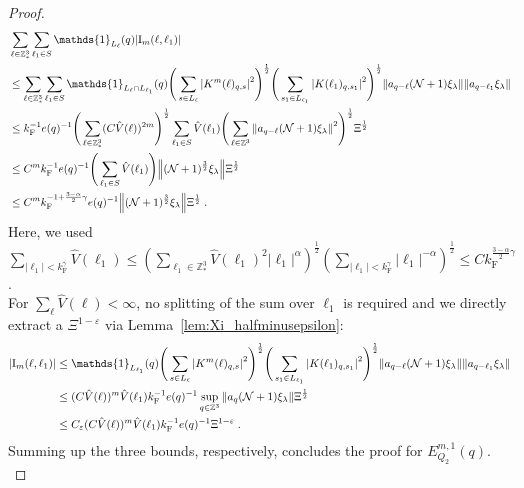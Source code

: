 \documentclass[12pt,a4paper]{article}
\numberwithin{equation}{section}
\newcommand{\1}{\mathbb{I}}
\newcommand{\F}{\mathrm{F}}
\newcommand{\I}{\mathrm{I}}
\newcommand{\Z}{\mathbb{Z}}
\newcommand{\NN}{\mathcal{N}}
\newcommand{\half}{\frac{1}{2}}
\theoremstyle{plain}
\theoremstyle{definition}
\theoremstyle{remark}
\theoremstyle{plain}
\theoremstyle{definition}
\theoremstyle{remark}
\begin{document}
\begin{proof}
\begin{align}
	&\sum_{\ell \in \Z^3_*} \sum_{\ell_1 \in S} \mathds{1}_{L_\ell}(q) |\I_m(\ell, \ell_1)| \nonumber\\
	&\leq \sum_{\ell \in \Z^3_*} \sum_{\ell_1 \in S} \mathds{1}_{L_\ell \cap L_{\ell_1}}(q) \Bigg(\sum\limits_{s \in L_{\ell}} \abs{K^m(\ell)_{q,s}}^2\Bigg)^\half
		\Bigg(\sum\limits_{s_1 \in L_{\ell_1}} \abs{K(\ell_1)_{q,s_1}}^2\Bigg)^\half
		\norm{ a_{q-\ell} (\NN+1) \xi_\lambda}
		\norm{ a_{q-\ell_1} \xi_\lambda }\nonumber\\
	&\leq k_{\F}^{-1} e(q)^{-1}
		\Bigg( \sum_{\ell \in \Z^3_*} (C \hat{V}(\ell))^{2m} \Bigg)^{\half}
		\sum_{\ell_1 \in S} \hat{V}(\ell_1)
		\Bigg( \sum_{\ell \in \Z^3} \norm{ a_{q-\ell} (\NN+1) \xi_\lambda}^2 \Bigg)^{\half}
		\Xi^{\half} \nonumber\\
	&\leq C^m k_{\F}^{-1} e(q)^{-1}
		\Bigg( \sum_{\ell_1 \in S} \hat{V}(\ell_1) \Bigg) \norm{(\NN+1)^{\frac 32} \xi_\lambda} \Xi^{\half} \nonumber\\
	&\leq C^m k_{\F}^{-1 + \frac{3-\alpha}{2} \gamma} e(q)^{-1}
		\norm{(\NN+1)^{\frac 32} \xi_\lambda} \Xi^{\half} \;. \label{eq:estEQ2113_Coulomb_2}
\end{align}
Here, we used $ \sum_{|\ell_1| < k_{\F}^\gamma} \hat{V}(\ell_1) \le \left( \sum_{\ell_1 \in \Z^3_*} \hat{V}(\ell_1)^2 |\ell_1|^\alpha \right)^{\half} \left( \sum_{|\ell_1| < k_{\F}^\gamma} |\ell_1|^{-\alpha} \right)^{\half} \le C k_{\F}^{\frac{3-\alpha}{2} \gamma} $.\\
For $ \sum_\ell \hat{V}(\ell) < \infty $, no splitting of the sum over $ \ell_1 $ is required and we directly extract a $ \Xi^{1-\varepsilon} $ via Lemma~\ref{lem:Xi_halfminusepsilon}:
\begin{align}
	|\I_m(\ell, \ell_1)|
	&\leq \mathds{1}_{L_{\ell_1}}(q) \Bigg(\sum_{s \in L_{\ell}} \abs{K^m(\ell)_{q,s}}^2\Bigg)^\half
		\Bigg(\sum_{s_1 \in L_{\ell_1}} \abs{K(\ell_1)_{q,s_1}}^2\Bigg)^\half
		\norm{ a_{q-\ell} (\NN+1) \xi_\lambda}
		\norm{ a_{q-\ell_1} \xi_\lambda }\nonumber\\
	&\leq (C \hat{V}(\ell))^m \hat{V}(\ell_1) k_{\F}^{-1} e(q)^{-1}
		\sup_{q \in \Z^3} \norm{ a_q (\NN+1) \xi_\lambda }\Xi^{\half} \nonumber\\
	&\leq C_\varepsilon (C \hat{V}(\ell))^m
		\hat{V}(\ell_1)
		k_{\F}^{-1} e(q)^{-1} \Xi^{1-\varepsilon} \;. \label{eq:estEQ2113}
\end{align}
Summing up the three bounds, respectively, concludes the proof for $ E^{m,1}_{Q_2}(q) $.\\


\end{proof}
\end{document}

